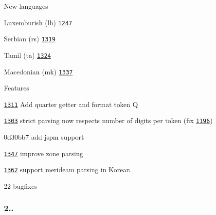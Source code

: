 \begin{DoxyItemize}
\item New languages
\begin{DoxyItemize}
\item Luxemburish (lb) \href{https://github.com/moment/moment/issues/1247}{\tt 1247}
\item Serbian (rs) \href{https://github.com/moment/moment/issues/1319}{\tt 1319}
\item Tamil (ta) \href{https://github.com/moment/moment/issues/1324}{\tt 1324}
\item Macedonian (mk) \href{https://github.com/moment/moment/issues/1337}{\tt 1337}
\end{DoxyItemize}
\item Features
\begin{DoxyItemize}
\item \href{https://github.com/moment/moment/issues/1311}{\tt 1311} Add quarter getter and format token {\ttfamily Q}
\item \href{https://github.com/moment/moment/issues/1303}{\tt 1303} strict parsing now respects number of digits per token (fix \href{https://github.com/moment/moment/issues/1196}{\tt 1196})
\item 0d30bb7 add jspm support
\item \href{https://github.com/moment/moment/issues/1347}{\tt 1347} improve zone parsing
\item \href{https://github.com/moment/moment/issues/1362}{\tt 1362} support merideam parsing in Korean
\end{DoxyItemize}
\item 22 bugfixes
\end{DoxyItemize}

\subsubsection*{2..}


